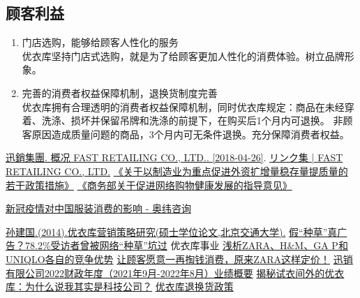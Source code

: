 \documentclass{xjtureport}
\begin{document}
\subsection{顾客利益}
\begin{enumerate}
    \item 门店选购，能够给顾客人性化的服务\\
    优衣库坚持门店式选购，就是为了给顾客更加人性化的消费体验。树立品牌形象。
    \item 完善的消费者权益保障机制，退换货制度完善\\
    优衣库拥有合理透明的消费者权益保障机制，同时优衣库规定：商品在未经穿着、洗涤、损坏并保留吊牌和洗涤的前提下，在购买后1个月内可退换。 非顾客原因造成质量问题的商品，3个月内可无条件退换。\cite{ref13}充分保障消费者权益。
\end{enumerate}
\begin{thebibliography}{99}  
 \href{https://web.archive.org/web/20210124040046/https://www.fastretailing.com/jp/about/company/}{迅銷集團. 概况 FAST RETAILING CO., LTD.. [2018-04-26]}. 
  \href{https://www.fastretailing.com/jx`p/about/links/}{リンク集 | FAST RETAILING CO., LTD.}
 \href{https://www.ndrc.gov.cn/xxgk/jd/jd/202210/t20221025_1339091.html?code=&state=123}{《关于以制造业为重点促进外资扩增量稳存量提质量的若干政策措施》}
 \href{http://www.mofcom.gov.cn/aarticle/b/g/201007/20100707044659.html}{《商务部关于促进网络购物健康发展的指导意见》}

 \href{https://www.oliverwyman.cn/content/dam/oliver-wyman/v2/publications/2020/may/thriving-in-the-new-normal_v2-cn.pdf}{新冠疫情对中国服装消费的影响 - 奥纬咨询}

 \href{https://kns.cnki.net/KCMS/detail/detail.aspx?dbname=CMFD201501&filename=1014374415.nh}{孙建国.(2014).优衣库营销策略研究(硕士学位论文,北京交通大学).}
 \href{http://zqb.cyol.com/html/2021-11/04/nw.D110000zgqnb_20211104_2-10.htm}{假“种草”真广告？78.2\%受访者曾被网络“种草”坑过}
 优衣库事业
 \href{https://www.zz-news.com/com/shichangliaowang/news/itemid-1277933.html}{浅析ZARA、H\&M、GA P和UNIQLO各自的竞争优势}
 \href{https://zhuanlan.zhihu.com/p/70433458}{让顾客愿意一再掏钱消费，原来ZARA这样定价！}
 \href{https://www.fastretailing.com/tc/ir/news/pdf/fr_ir_c_n20221013_4q_summary.pdf}{迅销有限公司2022财政年度（2021年9月-2022年8月）业绩概要}
 \href{https://baike.baidu.com/tashuo/browse/content?id=b1fc49abf08968763a28428e}{揭秘试衣间外的优衣库：为什么说我其实是科技公司？}
 \href{https://www.uniqlo.com/cn/corp/returnpolicy/}{优衣库退换货政策}
\end{thebibliography}
\end{document}
